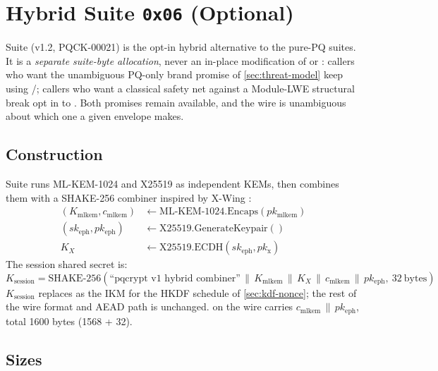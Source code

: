 \section{Hybrid Suite \texttt{0x06} (Optional)}
\label{sec:hybrid}

Suite  (v1.2, PQCK-00021) is the opt-in hybrid alternative to the pure-PQ suites. It is a \emph{separate suite-byte allocation}, never an in-place modification of  or : callers who want the unambiguous PQ-only brand promise of \cref{sec:threat-model} keep using /; callers who want a classical safety net against a Module-LWE structural break opt in to . Both promises remain available, and the wire is unambiguous about which one a given envelope makes.

\subsection{Construction}

Suite  runs ML-KEM-1024 and X25519 \citep{rfc7748} as independent KEMs, then combines them with a SHAKE-256 \citep{fips202} combiner inspired by X-Wing \citep{xwing-draft}:
\begin{align*}
(K_{\mathrm{mlkem}}, c_{\mathrm{mlkem}}) &\leftarrow \mathrm{ML\text{-}KEM\text{-}1024.Encaps}(pk_{\mathrm{mlkem}}) \\
(sk_{\mathrm{eph}}, pk_{\mathrm{eph}}) &\leftarrow \mathrm{X25519.GenerateKeypair}() \\
K_{X} &\leftarrow \mathrm{X25519.ECDH}(sk_{\mathrm{eph}}, pk_{\mathrm{x}})
\end{align*}
The session shared secret is:
$$
K_{\mathrm{session}} = \mathrm{SHAKE\text{-}256}\!\left(\text{``pqcrypt v1 hybrid combiner''} \,\|\, K_{\mathrm{mlkem}} \,\|\, K_{X} \,\|\, c_{\mathrm{mlkem}} \,\|\, pk_{\mathrm{eph}},\ 32\ \mathrm{bytes}\right)
$$
$K_{\mathrm{session}}$ replaces  as the IKM for the HKDF schedule of \cref{sec:kdf-nonce}; the rest of the wire format and AEAD path is unchanged.  on the wire carries $c_{\mathrm{mlkem}} \,\|\, pk_{\mathrm{eph}}$, total 1600 bytes (1568 + 32).

\subsection{Sizes}

